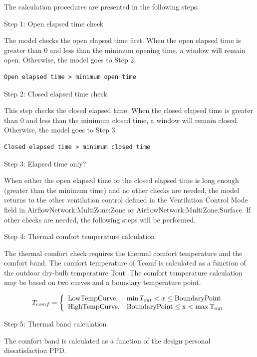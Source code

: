 The calculation procedures are presented in the following steps:

Step 1: Open elapsed time check

The model checks the open elapsed time first. When the open elapsed time is greater than 0 and less than the minimum opening time, a window will remain open. Otherwise, the model goes to Step 2.

\begin{lstlisting}
Open elapsed time > minimum open time
\end{lstlisting}

Step 2: Closed elapsed time check

This step checks the closed elapsed time. When the closed elapsed time is greater than 0 and less than the minimum closed time, a window will remain closed. Otherwise, the model goes to Step 3.

\begin{lstlisting}
Closed elapsed time > minimum closed time
\end{lstlisting}

Step 3: Elapsed time only?

When either the open elapsed time or the closed elapsed time is long enough (greater than the minimum time) and no other checks are needed, the model returns to the other ventilation control defined in the Ventilation Control Mode field in AirflowNetwork:MultiZone:Zone or AirflowNetwork:MultiZone:Surface. If other checks are needed, the following steps will be performed.

Step 4: Thermal comfort temperature calculation

The thermal comfort check requires the thermal comfort temperature and the comfort band. The comfort temperature of Tcomf is calculated as a function of the outdoor dry-bulb temperature Tout. The comfort temperature calculation may be based on two curves and a boundary temperature point.

\begin{equation}
T_{comf} = \left\{ \begin{array}{ll} \rm{Low Temp Curve,} & \min T_{out} < x \leq \rm{Boundary Point} \\ \rm{High Temp Curve,} & \rm{Boundary Point} \leq x < \max T_{out}  \end{array}\right.
\end{equation}

Step 5: Thermal band calculation

The comfort band is calculated as a function of the design personal dissatisfaction PPD.

